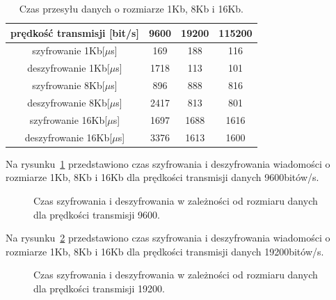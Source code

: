 \documentclass[12p]{article}
\begin{document}
\begin{table}[H]
\centering
\begin{tabular}{|c|c|c|c|}
\hline
prędkość transmisji [bit/s] &9600 &19200 &115200\\ \hline
szyfrowanie 1Kb[$\mu$s]&169&188&116\\ \hline
deszyfrowanie 1Kb[$\mu$s]&1718&113&101\\ \hline
szyfrowanie 8Kb[$\mu$s]&896&888&816\\ \hline
deszyfrowanie 8Kb[$\mu$s]&2417&813&801\\ \hline
szyfrowanie 16Kb[$\mu$s]&1697&1688&1616\\ \hline
deszyfrowanie 16Kb[$\mu$s]&3376&1613&1600\\ \hline
\end{tabular}
\caption{Czas przesyłu danych o rozmiarze 1Kb, 8Kb i 16Kb.}\label{czas_przesylu_1K,8K}
\end{table}

Na rysunku~\ref{czas_9600} przedstawiono czas szyfrowania i deszyfrowania wiadomości o rozmiarze 1Kb, 8Kb i 16Kb dla prędkości transmisji danych 9600bitów/s.

\begin{figure}[H]
\centering
{}
\caption{Czas szyfrowania i deszyfrowania w zależności od rozmiaru danych dla prędkości transmisji 9600.}\label{czas_9600}
\end{figure}
\newpage
Na rysunku~\ref{czas_19200} przedstawiono czas szyfrowania i deszyfrowania wiadomości o rozmiarze 1Kb, 8Kb i 16Kb dla prędkości transmisji danych 19200bitów/s.

\begin{figure}[H]
\centering
{}
\caption{Czas szyfrowania i deszyfrowania w zależności od rozmiaru danych dla prędkości transmisji 19200.}\label{czas_19200}
\end{figure}
\end{document}
